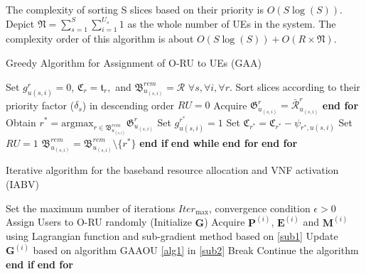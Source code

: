 \documentclass[lettersize,journal]{IEEEtran}
\begin{document}
The complexity of sorting S slices based on their priority is $O(S\log(S))$.
Depict $\mathfrak{N} =  \sum_{s=1}^S\sum_{i=1}^{U_s} 1$ as the whole number of UEs in the system.
The complexity order of this algorithm is about $O(S\log(S)) + O(R\times \mathfrak{N})$.
\begin{algorithm}
\small
\caption{Greedy Algorithm for Assignment of O-RU to UEs (GAA)}\label{alg1}
\begin{algorithmic}[1]
\State Set $g^r_{u(s,i)} = 0$, $\mathfrak{C}_r = \mathfrak{t}_r,$ and ${\mathfrak{B}}^{rem}_{u_{(s,i)}} = \mathcal{R}$   $\forall s, \forall i, \forall r$.\label{31}
\State Sort slices according to their priority factor ($\delta_s$) in descending order
\label{33}
\State $RU = 0$
\State Acquire $\mathfrak{G}^r_{u_{(s,i)}} = \bar{\mathcal{R}}^r_{u_{(s,i)}}$
\EndFor
\State \textbf{end for}
\State Obtain $r^* = \text{argmax}_{r\in{\mathfrak{B}}^{rem}_{u_{(s,i)}}} \mathfrak{G}^r_{u_{(s,i)}}$
\State Set $g^{r^*}_{u(s,i)} = 1$
\State Set  $\mathfrak{C}_{r^*} = \mathfrak{C}_{r^*} - \psi_{{r^*},u(s,i)}$
\State Set $RU = 1$
\Else
\State  ${\mathfrak{B}}^{rem}_{u_{(s,i)}} = {\mathfrak{B}}^{rem}_{u_{(s,i)}} \setminus \{{r^*}\} $
\EndIf
\State \textbf{end if}
\EndWhile
\State \textbf{end while}
\EndFor
\State \textbf{end for}
\EndFor
\State \textbf{end for} \label{34}
\end{algorithmic}
\end{algorithm}

 \begin{algorithm}
 \small
\caption{Iterative algorithm for the baseband resource allocation and VNF activation (IABV)}\label{alg2}
\begin{algorithmic}[1]
\State  Set the maximum number of iterations ${Iter}_{\max}$, convergence condition $\epsilon > 0$ \label{a21}
\State  Assign Users to O-RU randomly (Initialize $\boldsymbol{G}$) \label{a22}
\label{23}
\State Acquire $\boldsymbol{P}^{(i)}$, $\boldsymbol{E}^{(i)}$ and $\boldsymbol{M}^{(i)}$ using Lagrangian function and sub-gradient method based on \eqref{sub1}
\State Update $\boldsymbol{G}^{(i)}$   based on algorithm GAAOU \eqref{alg1} in  \eqref{sub2}
\State Break
\Else
\State Continue the algorithm
\EndIf
\State \textbf{end if}
\EndFor
\State \textbf{end for} \label{24}
\end{algorithmic}
\end{algorithm}
\end{document}
